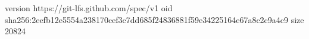 version https://git-lfs.github.com/spec/v1
oid sha256:2eefb12e5554a238170cef3c7dd685f24836881f59e34225164e67a8c2c9a4c9
size 20824
